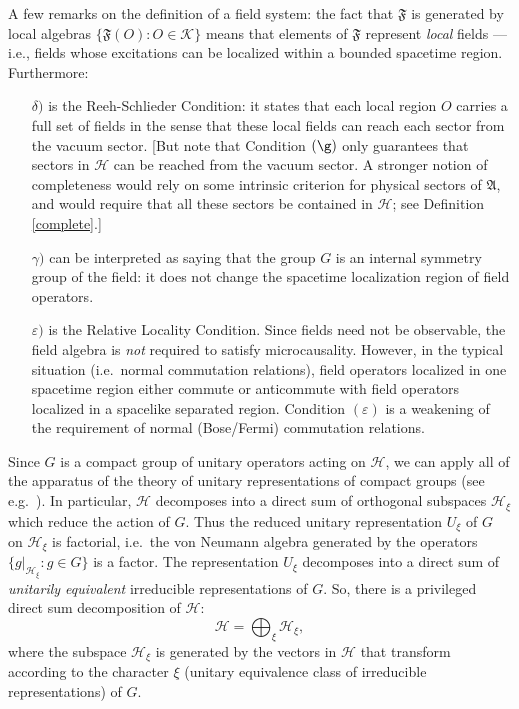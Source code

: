 \documentclass[12pt]{article}
\theoremstyle{definition}
\theoremstyle{definition}
\theoremstyle{remark}
\newcommand{\ve}{\varepsilon}
\def\2#1{{\mathcal #1}}
\def\al#1{{\mathfrak #1}}
\begin{document}
A few remarks on the definition of a field system: the
fact that $\al F$ is generated by local algebras $\{
\al F (O):O\in \2K \}$ means that elements of $\al F$
represent \emph{local} fields --- i.e., fields whose
excitations can be localized within a bounded spacetime
region.  Furthermore:

\begin{itemize} 
\item[$\delta )$] is the Reeh-Schlieder Condition: it
  states that each local region $O$ carries a full set
  of fields in the sense that these local fields can
  reach each sector from the vacuum sector.  [But note
  that Condition $(\g )$ only guarantees that sectors
  in $\2H$ can be reached from the vacuum sector.  A
  stronger notion of completeness would rely on some
  intrinsic criterion for physical sectors of $\al A$,
  and would require that all these sectors be contained
  in $\2H$; see Definition \ref{complete}.]
\item[$\gamma )$] can be interpreted as saying that the
  group $G$ is an internal symmetry group of the field:
  it does not change the spacetime localization region
  of field operators.
\item[$\ve )$] is the Relative Locality Condition.  Since fields need
  not be observable, the field algebra is \emph{not} required to
  satisfy microcausality.  However, in the typical situation (i.e.\
  normal commutation relations), field operators localized in one
  spacetime region either commute or anticommute with field operators
  localized in a spacelike separated region.  Condition $(\ve )$ is a
  weakening of the requirement of normal (Bose/Fermi) commutation
  relations.
\end{itemize}

Since $G$ is a compact group of unitary operators
acting on $\2H$, we can apply all of the apparatus of
the theory of unitary representations of compact groups
(see e.g.\ \cite{folland}).  In particular, $\2H$
decomposes into a direct sum of orthogonal subspaces
$\2H _{\xi}$ which reduce the action of $G$.  Thus the
reduced unitary representation $U_{\xi}$ of $G$ on $\2H
_\xi$ is factorial, i.e.\ the von Neumann algebra
generated by the operators $\{ g|_{\2H _\xi}:g\in G\}$
is a factor.  The representation $U_{\xi}$ decomposes
into a direct sum of \emph{unitarily equivalent}
irreducible representations of $G$.  So, there is a
privileged direct sum decomposition of $\2H$:
$$ \2H = \bigoplus _{\xi} \2H _{\xi} ,$$
where the subspace $\2H _{\xi}$ is generated by the vectors in $\2H$
that transform according to the character $\xi$ (unitary equivalence
class of irreducible representations) of $G$.
\end{document}
